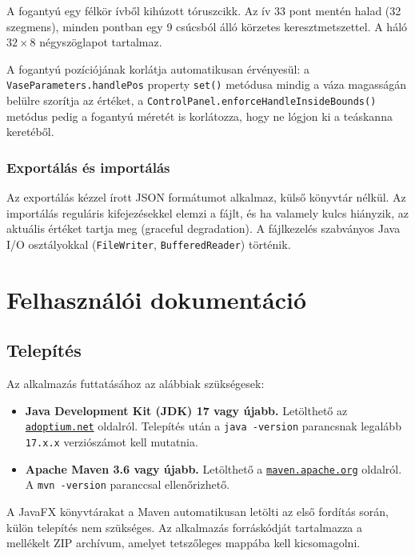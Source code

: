 \documentclass[12pt,a4paper]{article}
\newcommand{\code}[1]{\texttt{#1}}
\begin{document}
A fogantyú egy félkör ívből kihúzott tóruszcikk. Az ív 33 pont mentén halad
(32 szegmens), minden pontban egy 9 csúcsból álló körzetes keresztmetszettel.
A háló $32 \times 8$ négyszöglapot tartalmaz.

A fogantyú pozíciójának korlátja automatikusan érvényesül: a
\code{VaseParameters.handlePos} property \code{set()} metódusa mindig a váza
magasságán belülre szorítja az értéket, a \code{ControlPanel.enforceHandleInsideBounds()}
metódus pedig a fogantyú méretét is korlátozza, hogy ne lógjon ki a teáskanna keretéből.

\subsubsection{Exportálás és importálás}

Az exportálás kézzel írott JSON formátumot alkalmaz, külső könyvtár nélkül.
Az importálás reguláris kifejezésekkel elemzi a fájlt, és ha valamely kulcs hiányzik,
az aktuális értéket tartja meg (graceful degradation). A fájlkezelés szabványos Java
I/O osztályokkal (\code{FileWriter}, \code{BufferedReader}) történik.

\section{Felhasználói dokumentáció}

\subsection{Telepítés}

Az alkalmazás futtatásához az alábbiak szükségesek:

\begin{itemize}
  \item \textbf{Java Development Kit (JDK) 17 vagy újabb.} Letölthető az
        \href{https://adoptium.net}{\texttt{adoptium.net}} oldalról. Telepítés után a
        \code{java -version} parancsnak legalább \code{17.x.x} verziószámot kell
        mutatnia.
  \item \textbf{Apache Maven 3.6 vagy újabb.} Letölthető a
        \href{https://maven.apache.org}{\texttt{maven.apache.org}} oldalról. A
        \code{mvn -version} paranccsal ellenőrizhető.
\end{itemize}

A JavaFX könyvtárakat a Maven automatikusan letölti az első fordítás során, külön
telepítés nem szükséges. Az alkalmazás forráskódját tartalmazza a mellékelt ZIP
archívum, amelyet tetszőleges mappába kell kicsomagolni.
\end{document}
